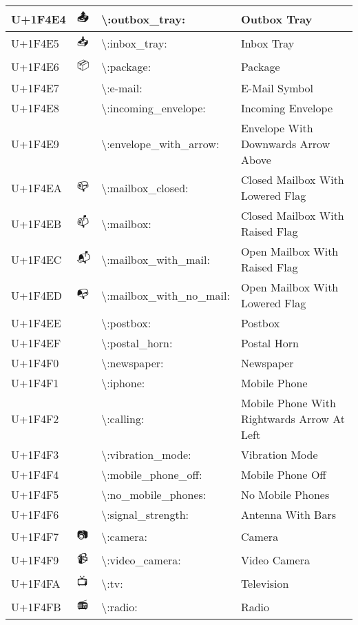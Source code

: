 \begin{table}[h]
\begin{tabulary}{\linewidth}{|L|L|L|L|}
U+1F4E4 & 📤 & {\textbackslash}:outbox\_tray: & Outbox Tray \\
\hline
U+1F4E5 & 📥 & {\textbackslash}:inbox\_tray: & Inbox Tray \\
\hline
U+1F4E6 & 📦 & {\textbackslash}:package: & Package \\
\hline
U+1F4E7 & 📧 & {\textbackslash}:e-mail: & E-Mail Symbol \\
\hline
U+1F4E8 & 📨 & {\textbackslash}:incoming\_envelope: & Incoming Envelope \\
\hline
U+1F4E9 & 📩 & {\textbackslash}:envelope\_with\_arrow: & Envelope With Downwards Arrow Above \\
\hline
U+1F4EA & 📪 & {\textbackslash}:mailbox\_closed: & Closed Mailbox With Lowered Flag \\
\hline
U+1F4EB & 📫 & {\textbackslash}:mailbox: & Closed Mailbox With Raised Flag \\
\hline
U+1F4EC & 📬 & {\textbackslash}:mailbox\_with\_mail: & Open Mailbox With Raised Flag \\
\hline
U+1F4ED & 📭 & {\textbackslash}:mailbox\_with\_no\_mail: & Open Mailbox With Lowered Flag \\
\hline
U+1F4EE & 📮 & {\textbackslash}:postbox: & Postbox \\
\hline
U+1F4EF & 📯 & {\textbackslash}:postal\_horn: & Postal Horn \\
\hline
U+1F4F0 & 📰 & {\textbackslash}:newspaper: & Newspaper \\
\hline
U+1F4F1 & 📱 & {\textbackslash}:iphone: & Mobile Phone \\
\hline
U+1F4F2 & 📲 & {\textbackslash}:calling: & Mobile Phone With Rightwards Arrow At Left \\
\hline
U+1F4F3 & 📳 & {\textbackslash}:vibration\_mode: & Vibration Mode \\
\hline
U+1F4F4 & 📴 & {\textbackslash}:mobile\_phone\_off: & Mobile Phone Off \\
\hline
U+1F4F5 & 📵 & {\textbackslash}:no\_mobile\_phones: & No Mobile Phones \\
\hline
U+1F4F6 & 📶 & {\textbackslash}:signal\_strength: & Antenna With Bars \\
\hline
U+1F4F7 & 📷 & {\textbackslash}:camera: & Camera \\
\hline
U+1F4F9 & 📹 & {\textbackslash}:video\_camera: & Video Camera \\
\hline
U+1F4FA & 📺 & {\textbackslash}:tv: & Television \\
\hline
U+1F4FB & 📻 & {\textbackslash}:radio: & Radio \\

\end{tabulary}
\end{table}
